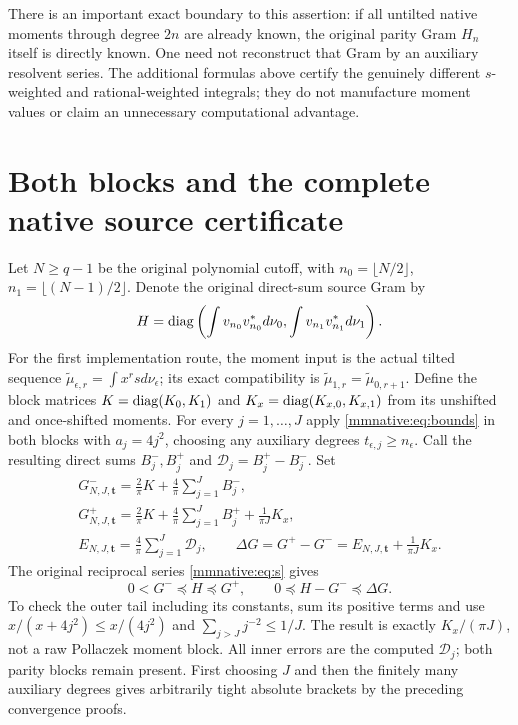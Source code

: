 \documentclass[11pt]{article}
\begin{document}
There is an important exact boundary to this assertion: if all
untilted native moments through degree $2n$ are already known, the
original parity Gram $H_n$ itself is directly known.  One need not
reconstruct that Gram by an auxiliary resolvent series.  The additional
formulas above certify the genuinely different $s$-weighted and
rational-weighted integrals; they do not manufacture moment values or
claim an unnecessary computational advantage.

\section{Both blocks and the complete native source certificate}

Let $N\ge q-1$ be the original polynomial cutoff, with
$n_0=\lfloor N/2\rfloor$, $n_1=\lfloor(N-1)/2\rfloor$.  Denote
the original direct-sum source Gram by
\[
 H=\operatorname{diag}\left(\int v_{n_0}v_{n_0}^*d\nu_0,
                  \int v_{n_1}v_{n_1}^*d\nu_1\right).
\]
For the first implementation route, the moment input is the actual
tilted sequence $\widetilde\mu_{\epsilon,r}=\int x^rsd\nu_\epsilon$;
its exact compatibility is
$\widetilde\mu_{1,r}=\widetilde\mu_{0,r+1}$.  Define the block
matrices $K=\operatorname{diag}(K_0,K_1)$ and
$K_x=\operatorname{diag}(K_{x,0},K_{x,1})$ from its unshifted and once-shifted
moments.  For every $j=1,\ldots,J$ apply \eqref{mmnative:eq:bounds} in
both blocks with $a_j=4j^2$, choosing any auxiliary degrees
$t_{\epsilon,j}\ge n_\epsilon$.  Call the resulting direct sums
$B_j^-,B_j^+$ and $\mathcal D_j=B_j^+-B_j^-$.  Set
\begin{equation}\label{mmnative:eq:Gpm}
 \begin{gathered}
 G^-_{N,J,\mathbf t}=\frac2\pi K+\frac4\pi\sum_{j=1}^JB_j^-,\\
 G^+_{N,J,\mathbf t}=\frac2\pi K+\frac4\pi\sum_{j=1}^JB_j^+
                       +\frac1{\pi J}K_x,\\
 E_{N,J,\mathbf t}=\frac4\pi\sum_{j=1}^J\mathcal D_j,
 \qquad\Delta G=G^+-G^-=E_{N,J,\mathbf t}+\frac1{\pi J}K_x.
 \end{gathered}
\end{equation}
The original reciprocal series \eqref{mmnative:eq:s} gives
\begin{equation}\label{mmnative:eq:sourcebounds}
 \boxed{0<G^-\preceq H\preceq G^+,\qquad
 0\preceq H-G^-\preceq\Delta G.}
\end{equation}
To check the outer tail including its constants, sum its positive
terms and use $x/(x+4j^2)\le x/(4j^2)$ and
$\sum_{j>J}j^{-2}\le1/J$.  The result is exactly
$K_x/(\pi J)$, not a raw Pollaczek moment block.  All inner errors
are the computed $\mathcal D_j$; both parity blocks remain present.
First choosing $J$ and then the finitely many auxiliary degrees gives
arbitrarily tight absolute brackets by the preceding convergence proofs.
\end{document}
